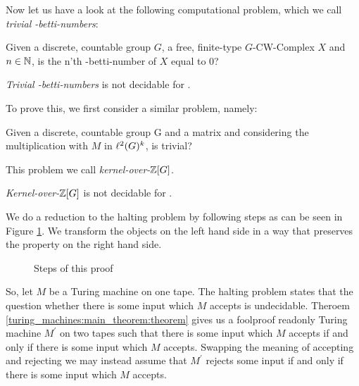 Now let us have a look at the following computational problem, which we call \emph{trivial \ltwo-betti-numbers}:

\begin{Problem}
	Given a discrete, countable group $G$, a free, finite-type $G$-CW-Complex $X$ and $n \in \mathbb{N}$, is the n'th \ltwo-betti-number of $X$ equal to 0?
\end{Problem}

\begin{Theorem}
	\label{zero-divisor-problem:trivial_betti_numbers}
	\emph{Trivial \ltwo-betti-numbers} is not decidable for .
\end{Theorem}


To prove this, we first consider a similar problem, namely:

\begin{Problem}
	Given a discrete, countable group G and a matrix 
	and considering the multiplication with $M$ in $\ell^2(G)^k$, is  trivial?
\end{Problem}

This problem we call \emph{kernel-over-$\mathbb{Z}[G]$}.

\begin{Theorem}
	\label{zero-divisor-problem:kernel-over-zg}
	\emph{Kernel-over-$\mathbb{Z}[G]$} is not decidable for .
\end{Theorem}

\proof
	We do a reduction to the halting problem by following steps as can be seen in Figure \ref{zero_divisor_problem:main_theorem:fig_proof_plan}.
	We transform the objects on the left hand side in a way that preserves the property on the right hand side.

	\begin{figure}[h]
		\centering
		
		\caption{Steps of this proof}
		\label{zero_divisor_problem:main_theorem:fig_proof_plan}
	\end{figure}

	So, let $M$ be a Turing machine on one tape.
	The halting problem states that the question whether there is some input which $M$ accepts is undecidable.
	Theroem \ref{turing_machines:main_theorem:theorem} gives us a foolproof readonly Turing machine $M^\prime$ on two tapes such that there is some input which $M$ accepts if and only if there is some input which $M$ accepts.\footnotemark
	Swapping the meaning of accepting and rejecting we may instead assume that $M^\prime$ rejects some input if and only if there is some input which $M$ accepts.

